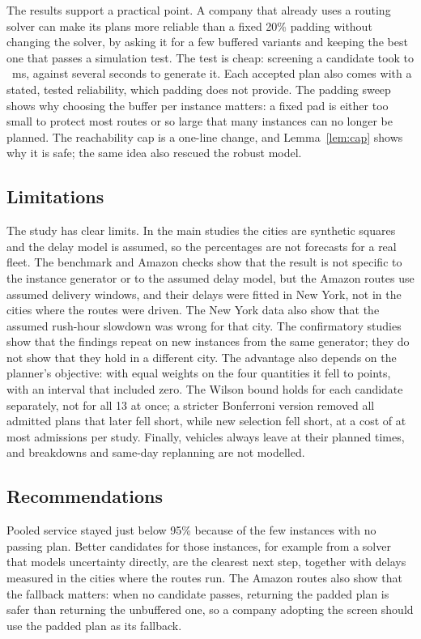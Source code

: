 \documentclass[12pt,letterpaper]{article}
\begin{document}
The results support a practical point. A company that already uses a routing solver
can make its plans more reliable than a fixed 20\% padding without changing the
solver, by asking it for a few buffered variants and keeping the best one that
passes a simulation test. The test is cheap: screening a candidate took
\TimeScreenTwenty{} to \TimeScreenTwoHundred{}~ms, against several seconds to
generate it. Each accepted plan also comes with a stated, tested reliability, which
padding does not provide. The padding sweep shows why choosing the buffer per
instance matters: a fixed pad is either too small to protect most routes or so
large that many instances can no longer be planned. The reachability cap is a one-line change, and
Lemma~\ref{lem:cap} shows why it is safe; the same idea also rescued the robust
model.

\subsection{Limitations}

The study has clear limits. In the main studies the cities are synthetic squares and the
delay model is assumed, so the percentages are not forecasts for a real fleet. The benchmark and Amazon checks show that the result is not specific to the
instance generator or to the assumed delay model, but the Amazon routes use
assumed delivery windows, and their delays were fitted in New York, not in the
cities where the routes were driven. The New York data also show that the assumed
rush-hour slowdown was wrong for that city. The confirmatory studies show that the findings repeat on new
instances from the same generator; they do not show that they hold in a different
city. The advantage also depends on the planner's objective: with equal weights on
the four quantities it fell to \WtEqualPCMean{} points, with an interval that
included zero. The Wilson bound holds for each candidate separately, not for all 13
at once; a stricter Bonferroni version removed all \FwMissOrig{} admitted plans that
later fell short, while \FwMissFw{} new selection fell short, at a cost of at most
\FwLostMax{} admissions per study. Finally, vehicles always leave at their planned
times, and breakdowns and same-day replanning are not modelled.

\subsection{Recommendations}

Pooled service stayed just below 95\% because of the few instances with no passing
plan. Better candidates for those instances, for example from a solver that models
uncertainty directly, are the clearest next step, together with delays measured in the
cities where the routes run. The Amazon routes also show that the fallback matters: when no
candidate passes, returning the padded plan is safer than returning the
unbuffered one, so a company adopting the screen should use the padded plan as its
fallback.
\end{document}
